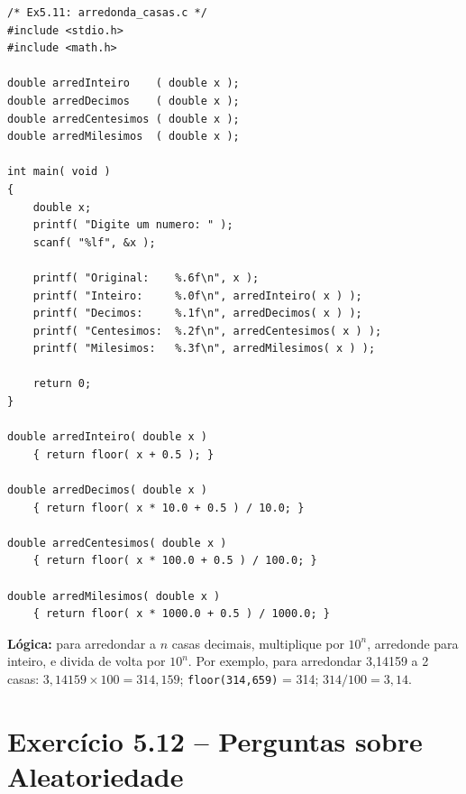 \documentclass[12pt,a4paper]{article}
\begin{document}
\begin{respostabox}
\begin{lstlisting}
/* Ex5.11: arredonda_casas.c */
#include <stdio.h>
#include <math.h>

double arredInteiro    ( double x );
double arredDecimos    ( double x );
double arredCentesimos ( double x );
double arredMilesimos  ( double x );

int main( void )
{
    double x;
    printf( "Digite um numero: " );
    scanf( "%lf", &x );

    printf( "Original:    %.6f\n", x );
    printf( "Inteiro:     %.0f\n", arredInteiro( x ) );
    printf( "Decimos:     %.1f\n", arredDecimos( x ) );
    printf( "Centesimos:  %.2f\n", arredCentesimos( x ) );
    printf( "Milesimos:   %.3f\n", arredMilesimos( x ) );

    return 0;
}

double arredInteiro( double x )
    { return floor( x + 0.5 ); }

double arredDecimos( double x )
    { return floor( x * 10.0 + 0.5 ) / 10.0; }

double arredCentesimos( double x )
    { return floor( x * 100.0 + 0.5 ) / 100.0; }

double arredMilesimos( double x )
    { return floor( x * 1000.0 + 0.5 ) / 1000.0; }
\end{lstlisting}

\textbf{Lógica:} para arredondar a $n$ casas decimais, multiplique por $10^n$,
arredonde para inteiro, e divida de volta por $10^n$. Por exemplo, para arredondar
3{,}14159 a 2 casas: $3{,}14159 \times 100 = 314{,}159$; \texttt{floor(314{,}659)} = 314;
$314 / 100 = 3{,}14$.
\end{respostabox}

\newpage

\section{Exercício 5.12 -- Perguntas sobre Aleatoriedade}
\end{document}
